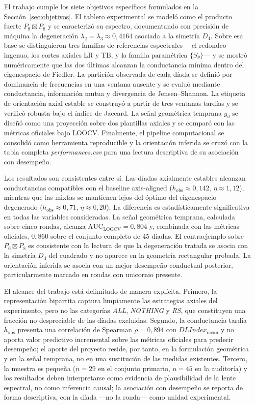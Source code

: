 \documentclass[journal]{IEEEtran}
\begin{document}
El trabajo cumple los siete objetivos específicos formulados en la Sección~\ref{sec:objetivos}. El tablero experimental se modeló como el producto fuerte $P_8 \boxtimes P_8$ y se caracterizó su espectro, documentando con precisión de máquina la degeneración $\lambda_2 = \lambda_3 \approx 0{,}4164$ asociada a la simetría $D_4$. Sobre esa base se distinguieron tres familias de referencias espectrales ---el redondeo ingenuo, los cortes axiales LR y TB, y la familia paramétrica $\{S_\theta\}$--- y se mostró numéricamente que las dos últimas alcanzan la conductancia mínima dentro del eigenespacio de Fiedler. La partición observada de cada díada se definió por dominancia de frecuencias en una ventana ausente y se evaluó mediante conductancia, información mutua y divergencia de Jensen--Shannon. La etiqueta de orientación axial estable se construyó a partir de tres ventanas tardías y se verificó robusta bajo el índice de Jaccard. La señal geométrica temprana $g_d$ se diseñó como una proyección sobre dos plantillas axiales y se comparó con las métricas oficiales bajo LOOCV. Finalmente, el pipeline computacional se consolidó como herramienta reproducible y la orientación inferida se cruzó con la tabla completa \emph{performances.csv} para una lectura descriptiva de su asociación con desempeño.

Los resultados son consistentes entre sí. Las díadas axialmente estables alcanzan conductancias compatibles con el baseline axis-aligned ($h_{\mathrm{obs}} \approx 0{,}142$, $\eta \approx 1{,}12$), mientras que las mixtas se mantienen lejos del óptimo del eigenespacio degenerado ($h_{\mathrm{obs}} \approx 0{,}71$, $\eta \approx 0{,}20$). La diferencia es estadísticamente significativa en todas las variables consideradas. La señal geométrica temprana, calculada sobre cinco rondas, alcanza $\mathrm{AUC}_{\mathrm{LOOCV}} = 0{,}804$ y, combinada con las métricas oficiales, $0{,}860$ sobre el conjunto completo de 45 díadas. El contraejemplo sobre $P_6 \boxtimes P_8$ es consistente con la lectura de que la degeneración tratada se asocia con la simetría $D_4$ del cuadrado y no aparece en la geometría rectangular probada. La orientación inferida se asocia con un mejor desempeño conductual posterior, particularmente marcado en rondas con unicornio presente.

El alcance del trabajo está delimitado de manera explícita. Primero, la representación bipartita captura limpiamente las estrategias axiales del experimento, pero no las categorías \emph{ALL}, \emph{NOTHING} y \emph{RS}, que constituyen una fracción no despreciable de las díadas excluidas. Segundo, la conductancia tardía $h_{\mathrm{obs}}$ presenta una correlación de Spearman $\rho = 0{,}894$ con $DLIndex_{\mathrm{mean}}$ y no aporta valor predictivo incremental sobre las métricas oficiales para predecir desempeño; el aporte del proyecto reside, por tanto, en la formulación geométrica y en la señal temprana, no en una sustitución de las medidas existentes. Tercero, la muestra es pequeña ($n=29$ en el conjunto primario, $n=45$ en la auditoría) y los resultados deben interpretarse como evidencia de plausibilidad de la lente espectral, no como inferencia causal; la asociación con desempeño se reporta de forma descriptiva, con la díada ---no la ronda--- como unidad experimental.
\end{document}
